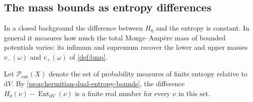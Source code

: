 \subsection{The mass bounds as entropy differences}

In a closed background the difference between $H_0$ and the entropy is constant. In general it measures how much the total Monge--Amp\`ere mass of bounded potentials varies: its infimum and supremum recover the lower and upper masses $v_-(\omega)$ and $v_+(\omega)$ of \cref{def:bmp}.

Let $\mathcal P_{\mathrm{ent}}(X)$ denote the set of probability measures of finite entropy relative to $\mathrm{d}V$. By \cref{prop:hermitian-dual-entropy-bounds}, the difference $H_0(\nu)-\operatorname{Ent}_{\mathrm{d}V}(\nu)$ is a finite real number for every $\nu$ in this set.

